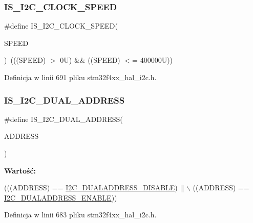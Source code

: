 \subsubsection{\texorpdfstring{I\+S\+\_\+\+I2\+C\+\_\+\+C\+L\+O\+C\+K\+\_\+\+S\+P\+E\+ED}{IS\_I2C\_CLOCK\_SPEED}}
{\footnotesize\ttfamily \#define I\+S\+\_\+\+I2\+C\+\_\+\+C\+L\+O\+C\+K\+\_\+\+S\+P\+E\+ED(\begin{DoxyParamCaption}\item[{}]{S\+P\+E\+ED }\end{DoxyParamCaption})~(((S\+P\+E\+ED) $>$ 0\+U) \&\& ((\+S\+P\+E\+E\+D) $<$= 400000\+U))}



Definicja w linii 691 pliku stm32f4xx\+\_\+hal\+\_\+i2c.\+h.

\mbox{\label{group___i2_c___i_s___r_t_c___definitions_gae683c113d4088dfae90fbe6677f8296a}} 
\subsubsection{\texorpdfstring{I\+S\+\_\+\+I2\+C\+\_\+\+D\+U\+A\+L\+\_\+\+A\+D\+D\+R\+E\+SS}{IS\_I2C\_DUAL\_ADDRESS}}
{\footnotesize\ttfamily \#define I\+S\+\_\+\+I2\+C\+\_\+\+D\+U\+A\+L\+\_\+\+A\+D\+D\+R\+E\+SS(\begin{DoxyParamCaption}\item[{}]{A\+D\+D\+R\+E\+SS }\end{DoxyParamCaption})}

{\bfseries Wartość\+:}
\begin{DoxyCode}
(((ADDRESS) == \hyperlink{group___i2_c__dual__addressing__mode_gacb8f4a1fd543e5ef2c9e7711fc9b5a67}{I2C\_DUALADDRESS\_DISABLE}) || \(\backslash\)
                                      ((ADDRESS) == \hyperlink{group___i2_c__dual__addressing__mode_gae33ff5305d9f38d857cff1774f481fab}{I2C\_DUALADDRESS\_ENABLE}))
\end{DoxyCode}


Definicja w linii 683 pliku stm32f4xx\+\_\+hal\+\_\+i2c.\+h.

